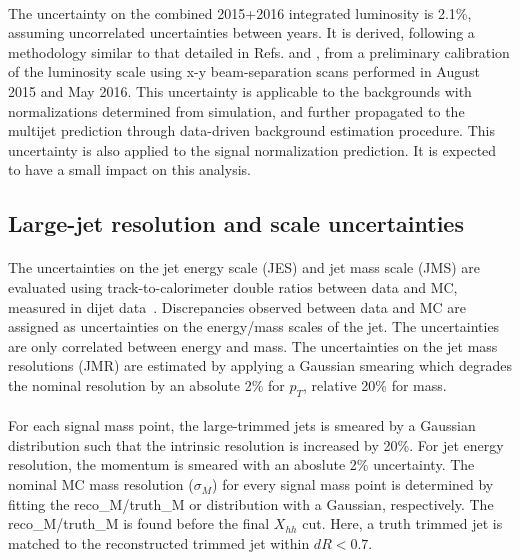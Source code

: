 \paragraph{}
The uncertainty on the combined 2015+2016 integrated luminosity is 2.1\%, assuming uncorrelated uncertainties between years. 
It is derived, following a methodology similar to that detailed in Refs. \cite{Aad:2013ucp} and \cite{ATLASlumi8TeV}, from a preliminary calibration of the luminosity scale using x-y beam-separation scans performed in August 2015 and May 2016. 
This uncertainty is applicable to the backgrounds with normalizations determined from simulation, and further propagated to the multijet prediction through data-driven background estimation procedure. 
This uncertainty is also applied to the signal normalization prediction.
It is expected to have a small impact on this analysis. 


\subsection{Large-\R jet resolution and scale uncertainties} 
\paragraph{}
The uncertainties on the jet energy scale (JES) and jet mass scale (JMS) are evaluated using track-to-calorimeter double ratios between data and MC, measured in dijet data~\cite{Aad:2013gja,BosonTagPreRec}. 
Discrepancies observed between data and MC are assigned as uncertainties on the energy/mass scales of the jet. 
The uncertainties are only correlated between energy and mass.
The uncertainties on the jet mass resolutions (JMR) are estimated by applying a Gaussian smearing which degrades the nominal resolution by an absolute 2\% for $p_{T}$, relative 20\% for mass.

\paragraph{}
For each signal mass point, the large-\R trimmed jets is smeared by a Gaussian distribution such that the intrinsic resolution is increased by 20\%. 
For jet energy resolution, the momentum is smeared with an aboslute 2\% uncertainty. 
The nominal MC mass resolution ($\sigma_{M}$) for every signal mass point is determined by fitting the reco\_M/truth\_M or distribution with a Gaussian, respectively. 
The reco\_M/truth\_M is found before the final $X_{hh}$ cut. Here, a truth trimmed jet is matched to the reconstructed trimmed jet within $dR<0.7$.


